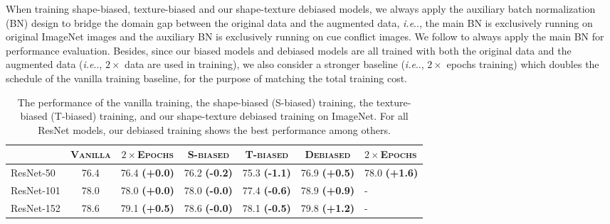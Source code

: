 \documentclass{article} \usepackage{iclr2021_conference,times}
\makeatletter
\DeclareRobustCommand\onedot{\futurelet\@let@token\@onedot}
\def\@onedot{\ifx\@let@token.\else.\null\fi\xspace}
\def\ie{\emph{i.e}\onedot} \def\Ie{\emph{I.e}\onedot}
\makeatother
\begin{document}
When training shape-biased, texture-biased and our shape-texture debiased models, we always apply the auxiliary batch normalization (BN) design \citep{xie2019adversarial,Xie2020intriguing,chen2021robust} to bridge the domain gap between the original data and the augmented data, \ie, the main BN is exclusively running on original ImageNet images and the auxiliary BN is exclusively running on cue conflict images. We follow \citet{xie2019adversarial} to always apply the main BN for performance evaluation. Besides, since our biased models and debiased models are all trained with both the original data and the augmented data (\ie, $2\times$ data are used in training), we also consider a stronger baseline (\ie, $2\times$ epochs training) which doubles the schedule of the vanilla training baseline, for the purpose of matching the total training cost.

\begin{table}[t]
\renewcommand\arraystretch{0.8}
\small
\centering
\begin{tabular}{l|cc|cc|cH}
\toprule
           & \scshape{Vanilla} & \scshape{$2\times$Epochs}  & \scshape{S-biased} & \scshape{T-biased} & \scshape{Debiased} & \scshape{$2\times$Epochs} \\
\midrule
ResNet-50  & 76.4    & 76.4 {\footnotesize \color{Highlight} \textbf{(+0.0)}}   & 76.2 {\footnotesize \color{red} \textbf{(-0.2)}}         & 75.3 {\footnotesize \color{red} \textbf{(-1.1)}}              & 76.9 {\footnotesize \color{Highlight} \textbf{(+0.5)}} & 78.0 {\footnotesize \color{Highlight} \textbf{(+1.6)}} \\
ResNet-101 & 78.0    & 78.0 {\footnotesize \color{Highlight} \textbf{(+0.0)}}   & 78.0 {\footnotesize \color{red} \textbf{(-0.0)}}            & 77.4 {\footnotesize \color{red} \textbf{(-0.6)}}              & 78.9 {\footnotesize \color{Highlight} \textbf{(+0.9)}} & -   \\
ResNet-152 & 78.6    & 79.1 {\footnotesize \color{Highlight} \textbf{(+0.5)}}   & 78.6 {\footnotesize \color{red} \textbf{(-0.0)}}         & 78.1 {\footnotesize \color{red} \textbf{(-0.5)}}              & 79.8 {\footnotesize \color{Highlight} \textbf{(+1.2)}} & - \\
\bottomrule
\end{tabular}
\vspace{-0.9em}
\caption{The performance of the vanilla training, the shape-biased (S-biased) training, the texture-biased (T-biased) training, and our shape-texture debiased training on ImageNet. For all ResNet models, our debiased training shows the best performance among others.}
\label{tab:imagenet_acc}
\vspace{-0.8em}
\end{table}
\end{document}
